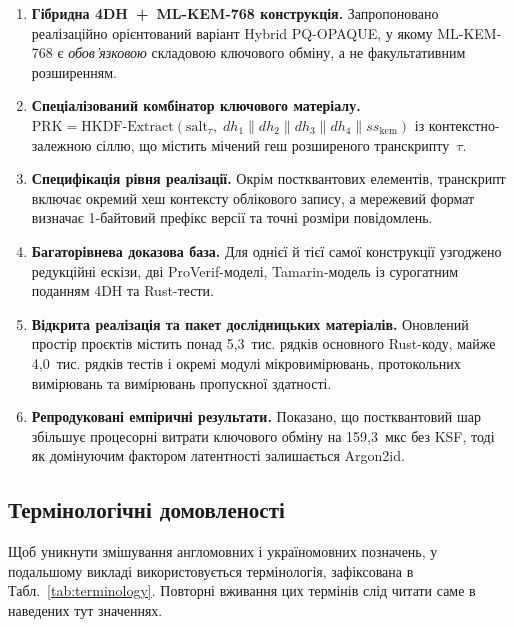 \documentclass{llncs}
\begin{document}
\begin{enumerate}
  \item \textbf{Гібридна 4DH~+~ML-KEM-768 конструкція.} Запропоновано
        реалізаційно орієнтований варіант Hybrid PQ-OPAQUE, у якому
        ML-KEM-768 є \emph{обов'язковою} складовою ключового обміну, а не
        факультативним розширенням.
  \item \textbf{Спеціалізований комбінатор ключового матеріалу.}
        $\mathrm{PRK} = \mathrm{HKDF\text{-}Extract}(\mathrm{salt}_\tau,\;
        dh_1 \| dh_2 \| dh_3 \| dh_4 \| ss_{\mathrm{kem}})$ із
        контекстно-залежною сіллю, що містить мічений геш розширеного
        транскрипту~$\tau$.
  \item \textbf{Специфікація рівня реалізації.} Окрім постквантових елементів,
        транскрипт включає окремий хеш контексту облікового запису,
        а мережевий формат визначає 1-байтовий префікс версії та точні
        розміри повідомлень.
  \item \textbf{Багаторівнева доказова база.} Для однієї й тієї самої
        конструкції узгоджено редукційні ескізи, дві ProVerif-моделі,
        Tamarin-модель із сурогатним поданням 4DH та Rust-тести.
  \item \textbf{Відкрита реалізація та пакет дослідницьких матеріалів.} Оновлений простір проєктів
        містить понад 5,3~тис. рядків основного Rust-коду, майже
        4,0~тис. рядків тестів і окремі модулі мікровимірювань,
        протокольних вимірювань та вимірювань пропускної здатності.
  \item \textbf{Репродуковані емпіричні результати.} Показано, що
        постквантовий шар збільшує процесорні витрати ключового обміну на
        159,3~мкс без KSF, тоді як домінуючим фактором латентності
        залишається Argon2id.
\end{enumerate}

\subsection{Термінологічні домовленості}

Щоб уникнути змішування англомовних і україномовних позначень, у
подальшому викладі використовується термінологія, зафіксована в
Табл.~\ref{tab:terminology}. Повторні вживання цих термінів слід
читати саме в наведених тут значеннях.
\end{document}
